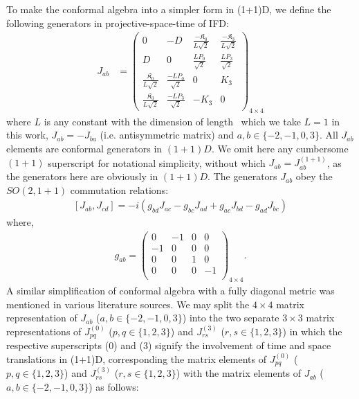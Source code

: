 \documentclass[%
 reprint,
superscriptaddress,
 amsmath,amssymb,
 aps,
]{revtex4-2}
\begin{document}
To make the conformal algebra into a simpler form in (1+1)D, we define the following generators in projective-space-time of IFD:
\begin{align}\label{Jab}
  J_{ab}&=
  \begin{pmatrix}
  0&-D&\frac{-\mathfrak{K}_0}{L\sqrt{2}}&\frac{-\mathfrak{K}_3}{L\sqrt{2}}\\
  D&0&\frac{LP_0}{\sqrt{2}}&\frac{LP_3}{\sqrt{2}}\\
    \frac{\mathfrak{K}_0}{L\sqrt{2}}&\frac{-LP_0}{\sqrt{2}}&0  & K_{3}\\
    \frac{\mathfrak{K}_3}{L\sqrt{2}}&\frac{-LP_3}{\sqrt{2}}&-K_{3} & 0
  \end{pmatrix}_{4\times4}
\end{align}
where $L$ is any constant with the dimension of length~\cite{Fubini1976} which we take $L=1$ in this work, $J_{ab}=-J_{ba}$ (i.e. antisymmetric matrix) and $a,b\in\{-2,-1,0,3\}$. All $J_{ab}$ elements are conformal generators in $(1+1)D$. We omit here any cumbersome $(1+1)$ superscript for notational simplicity, without which $J_{ab} = J^{(1+1)}_{ab}$, as the generators here are obviously in $(1+1)D$. The generators $J_{ab}$ obey the $SO(2,1+1)$ commutation relations:
  \begin{align}\label{JabalgebraIFD}
      \left[J_{{a}{b}},J_{{c}{d}}\right]=-i\left(g_{{b}{d}}J_{{a}{c}}-g_{{b}{c}}J_{{a}{d}}+g_{{a}{c}}J_{{b}{d}}-g_{{a}{d}}J_{{b}{c}}\right)
  \end{align}
where, 
  \begin{align}\label{metric}
      g_{ab}=\begin{pmatrix}
  0&-1&0&0\\
  -1&0&0&0\\
  0&0&1&0\\
  0&0&0&-1\\
  \end{pmatrix}_{4\times4}.
  \end{align}
A similar simplification of conformal algebra with a fully diagonal metric was mentioned in various literature sources\cite {SalamMack1969, Francesco}. We may split the $4\times4$ matrix representation of $J_{ab}$ ($a,b\in\{-2,-1,0,3\}$) into the two separate $3\times3$ matrix representations of $J^{(0)}_{pq}$ ($p,q\in\{1,2,3\}$) and $J^{(3)}_{rs}$ ($r,s\in\{1,2,3\}$) in which the respective superscripts (0) and (3) signify the involvement of time and space translations in (1+1)D, corresponding the matrix elements of $J^{(0)}_{pq}$ ($p,q\in\{1,2,3\}$) and $J^{(3)}_{rs}$ ($r,s\in\{1,2,3\}$) with the matrix elements of $J_{ab}$ ($a,b\in\{-2,-1,0,3\}$) as follows:
\end{document}
